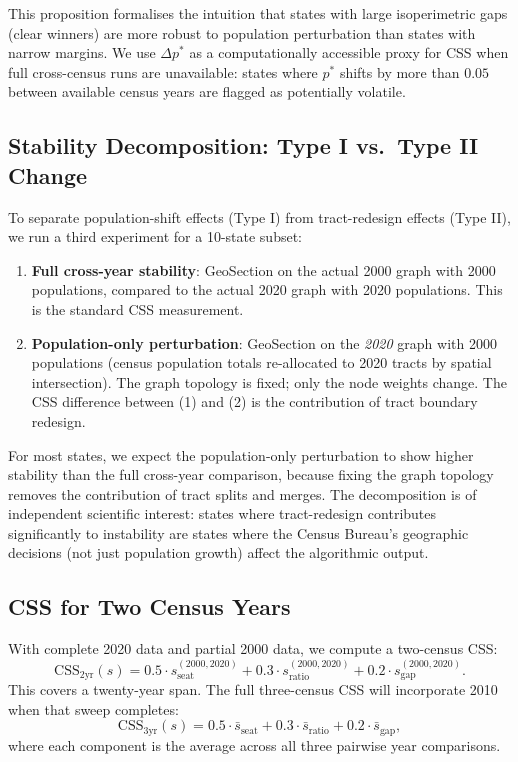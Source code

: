 This proposition formalises the intuition that states with large isoperimetric
gaps (clear winners) are more robust to population perturbation than states
with narrow margins.
We use $\Delta p^*$ as a computationally accessible proxy for CSS when
full cross-census runs are unavailable: states where $p^*$ shifts by more
than $0.05$ between available census years are flagged as potentially volatile.

\subsection{Stability Decomposition: Type I vs.\ Type II Change}
\label{sec:decomposition}

To separate population-shift effects (Type I) from tract-redesign effects
(Type II), we run a third experiment for a 10-state subset:

\begin{enumerate}
\item \textbf{Full cross-year stability}: GeoSection on the actual 2000 graph
  with 2000 populations, compared to the actual 2020 graph with 2020
  populations.
  This is the standard CSS measurement.

\item \textbf{Population-only perturbation}: GeoSection on the \emph{2020}
  graph with 2000 populations (census population totals re-allocated to
  2020 tracts by spatial intersection).
  The graph topology is fixed; only the node weights change.
  The CSS difference between (1) and (2) is the contribution of tract
  boundary redesign.
\end{enumerate}

For most states, we expect the population-only perturbation to show higher
stability than the full cross-year comparison, because fixing the graph
topology removes the contribution of tract splits and merges.
The decomposition is of independent scientific interest: states where
tract-redesign contributes significantly to instability are states where
the Census Bureau's geographic decisions (not just population growth) affect
the algorithmic output.

\subsection{CSS for Two Census Years}
\label{sec:two-year-css}

With complete 2020 data and partial 2000 data, we compute a two-census CSS:
\[
  \mathrm{CSS}_{2\text{yr}}(s) = 0.5 \cdot s_{\text{seat}}^{(2000,2020)}
                                + 0.3 \cdot s_{\text{ratio}}^{(2000,2020)}
                                + 0.2 \cdot s_{\text{gap}}^{(2000,2020)}.
\]
This covers a twenty-year span.
The full three-census CSS will incorporate 2010 when that sweep completes:
\[
  \mathrm{CSS}_{3\text{yr}}(s) = 0.5 \cdot \bar{s}_{\text{seat}}
                                + 0.3 \cdot \bar{s}_{\text{ratio}}
                                + 0.2 \cdot \bar{s}_{\text{gap}},
\]
where each component is the average across all three pairwise year comparisons.

